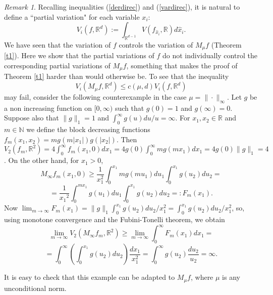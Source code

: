 \documentclass[12pt]{amsart}
\numberwithin{equation}{section}
\theoremstyle{plain}
\theoremstyle{definition}
\theoremstyle{remark}
\newtheorem{remark}[theorem]{Remark}
\begin{document}
\begin{remark}
Recalling  inequalities (\ref{derdirec}) and (\ref{vardirec}),
it is natural to define a ``partial variation" for each variable $x_i$:
\begin{equation*}
  V_i(f,\mathbb{R}^d):=\int_{\mathbb{R}^{d-1}}V(f_{\hat{x}_i},\mathbb{R})d\hat{x}_i.
\end{equation*}
We have seen that the variation of $f$ controls the variation
of $M_\mu f$ (Theorem \ref{t1}). Here we show that the
partial variations of $f$ do not individually control the corresponding
partial variations of $M_\mu f$, something that makes the proof
of Theorem \ref{t1} harder than would otherwise be.
To see that the
inequality
  \begin{equation*}
    V_i(M_\mu f,\mathbb{R}^d)\le c(\mu, d)V_i(f,\mathbb{R}^d)
  \end{equation*}
may fail, consider the following counterexample in the case
$\mu = \|\cdot\|_\infty$.
Let $g$ be a non increasing function on $[0,\infty)$ such that
$g(0)=1$ and $g(\infty)=0$. Suppose also that $\|g\|_1=1$ and
$\int_0^\infty g(u)du/u=\infty$.
For $x_1,x_2\in\mathbb{R}$ and $m\in\mathbb{N}$ we define the block decreasing functions
$f_m(x_1,x_2)=mg(m|x_1|)g(|x_2|)$.
Then $V_2(f_m,\mathbb{R}^2)=4\int_0^\infty
f_m(x_1,0)dx_1=4g(0)\int_0^\infty mg(mx_1)dx_1=4g(0)\|g\|_1=4$.
On the other hand, for $x_1>0$,
\begin{equation*}
M_\infty f_m(x_1,0)\ge \frac{1}{x_1^2}\int_0^{x_1} mg(mu_1)du_1\int_0^{x_1}
g(u_2)du_2=
\end{equation*}
\begin{equation*}
= \frac{1}{{x_1}^2}\int_0^{mx_1} g(u_1)du_1\int_0^{x_1} g(u_2)du_2=:
F_m(x_1).
\end{equation*}
Now
$\lim_{m\rightarrow\infty}F_m(x_1)=\|g\|_1\int_0^{x_1}g(u_2)du_2/x_1^2=\int_0^{x_1}g(u_2)du_2/x_1^2$,
so, using monotone convergence and the Fubini-Tonelli theorem, we obtain
\begin{equation*}
\lim_{m\rightarrow\infty}V_2(M_\infty f_m,\mathbb{R}^2)\ge\lim_{m\rightarrow\infty}\int_0^\infty
  F_m (x_1) dx_1=
\end{equation*}
\begin{equation*}
=   \int_0^\infty
 \left(\int_0^{x_1}g(u_2)du_2\right) \frac{dx_1}{x_1^2}
   =\int_0^\infty g(u_2)\frac{du_2}{u_2}=\infty.
\end{equation*}

It is easy to check that this
example  can be adapted to  $M_\mu f$, where  $\mu$ is any  unconditional norm.
\end{remark}
\end{document}
